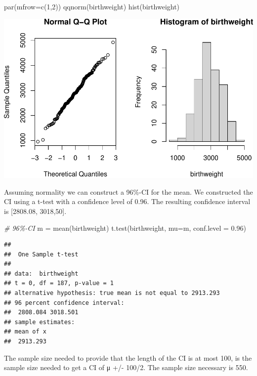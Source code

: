 \documentclass[
]{article}
\newenvironment{Shaded}{\begin{snugshade}}{\end{snugshade}}
\newcommand{\AttributeTok}[1]{\textcolor[rgb]{0.77,0.63,0.00}{#1}}
\newcommand{\CommentTok}[1]{\textcolor[rgb]{0.56,0.35,0.01}{\textit{#1}}}
\newcommand{\DecValTok}[1]{\textcolor[rgb]{0.00,0.00,0.81}{#1}}
\newcommand{\FloatTok}[1]{\textcolor[rgb]{0.00,0.00,0.81}{#1}}
\newcommand{\FunctionTok}[1]{\textcolor[rgb]{0.00,0.00,0.00}{#1}}
\newcommand{\NormalTok}[1]{#1}
\newcommand{\OtherTok}[1]{\textcolor[rgb]{0.56,0.35,0.01}{#1}}
\begin{document}
\begin{Shaded}
\begin{Highlighting}[]
\FunctionTok{par}\NormalTok{(}\AttributeTok{mfrow=}\FunctionTok{c}\NormalTok{(}\DecValTok{1}\NormalTok{,}\DecValTok{2}\NormalTok{))}
\FunctionTok{qqnorm}\NormalTok{(birthweight)}
\FunctionTok{hist}\NormalTok{(birthweight)}
\end{Highlighting}
\end{Shaded}

\includegraphics{assignment_1_files/figure-latex/unnamed-chunk-2-1.pdf}

Assuming normality we can construct a 96\%-CI for the mean. We
constructed the CI using a t-test with a confidence level of 0.96. The
resulting confidence interval is {[}2808.08, 3018,50{]}.

\begin{Shaded}
\begin{Highlighting}[]
\CommentTok{\# 96\%{-}CI}
\NormalTok{m }\OtherTok{=} \FunctionTok{mean}\NormalTok{(birthweight)}
\FunctionTok{t.test}\NormalTok{(birthweight, }\AttributeTok{mu=}\NormalTok{m, }\AttributeTok{conf.level =} \FloatTok{0.96}\NormalTok{)}
\end{Highlighting}
\end{Shaded}

\begin{verbatim}
## 
##  One Sample t-test
## 
## data:  birthweight
## t = 0, df = 187, p-value = 1
## alternative hypothesis: true mean is not equal to 2913.293
## 96 percent confidence interval:
##  2808.084 3018.501
## sample estimates:
## mean of x 
##  2913.293
\end{verbatim}

The sample size needed to provide that the length of the CI is at most
100, is the sample size needed to get a CI of μ +/- 100/2. The sample
size necessary is 550.
\end{document}
